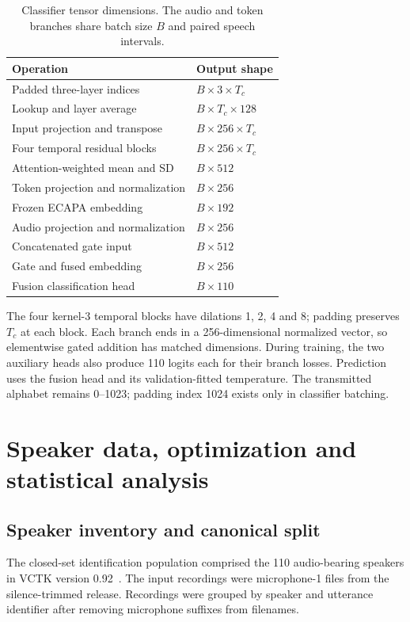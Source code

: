 \begin{table}[t]
\centering
\caption{Classifier tensor dimensions. The audio and token branches share batch size $B$ and paired speech intervals.}
\label{tab:sv3-classifier-shapes}
\small
\begin{tabularx}{\columnwidth}{@{}Yl@{}}
\toprule
Operation & Output shape\\
\midrule
Padded three-layer indices & $B\times3\times T_c$\\
Lookup and layer average & $B\times T_c\times128$\\
Input projection and transpose & $B\times256\times T_c$\\
Four temporal residual blocks & $B\times256\times T_c$\\
Attention-weighted mean and SD & $B\times512$\\
Token projection and normalization & $B\times256$\\
Frozen ECAPA embedding & $B\times192$\\
Audio projection and normalization & $B\times256$\\
Concatenated gate input & $B\times512$\\
Gate and fused embedding & $B\times256$\\
Fusion classification head & $B\times110$\\
\bottomrule
\end{tabularx}
\end{table}

The four kernel-3 temporal blocks have dilations 1, 2, 4 and 8; padding preserves $T_c$ at each block. Each branch ends in a 256-dimensional normalized vector, so elementwise gated addition has matched dimensions. During training, the two auxiliary heads also produce 110 logits each for their branch losses. Prediction uses the fusion head and its validation-fitted temperature. The transmitted alphabet remains 0--1023; padding index 1024 exists only in classifier batching.

\section{Speaker data, optimization and statistical analysis}
\label{sec:sv2-speaker-protocol}

\subsection{Speaker inventory and canonical split}
The closed-set identification population comprised the 110 audio-bearing speakers in VCTK version 0.92~\cite{vctk}. The input recordings were microphone-1 files from the silence-trimmed release. Recordings were grouped by speaker and utterance identifier after removing microphone suffixes from filenames.

